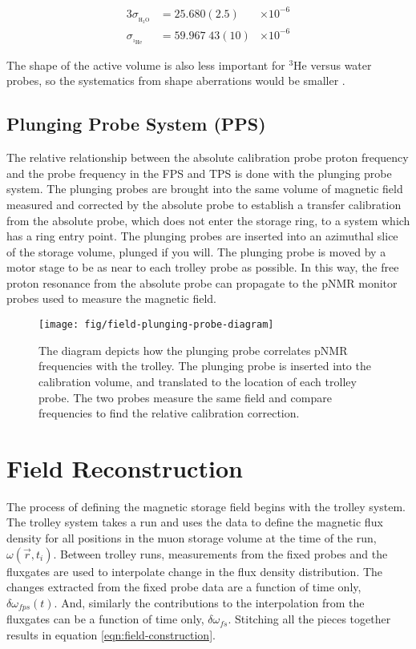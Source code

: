 \begin{alignat}{3}
\sigma_{_{\mathrm{H_2 O}}} & = 25.680(2.5)  & \times 10^{-6} \\
\sigma_{_{\mathrm{^3He}}}  & = 59.967\;43(10) & \times 10^{-6} 
\end{alignat}

\noindent
The shape of the active volume is also less important for $\mathrm{^3He}$ versus water probes, so the systematics from shape aberrations would be smaller \cite{e989-tdr}.

\subsection{Plunging Probe System (PPS)}

The relative relationship between the absolute calibration probe proton frequency and the probe frequency in the FPS and TPS is done with the plunging probe system.  The plunging probes are brought into the same volume of magnetic field measured and corrected by the absolute probe to establish a transfer calibration from the absolute probe, which does not enter the storage ring, to a system which has a ring entry point.  The plunging probes are inserted into an azimuthal slice of the storage volume, plunged if you will.  The plunging probe is moved by a motor stage to be as near to each trolley probe as possible.  In this way, the free proton resonance from the absolute probe can propagate to the pNMR monitor probes used to measure the \gmtwo magnetic field.

\begin{figure}
\label{fig:field-plunging-probe-diagram}
\texttt{[image: fig/field-plunging-probe-diagram]}
\caption{The diagram depicts how the plunging probe correlates pNMR frequencies with the trolley.  The plunging probe is inserted into the calibration volume, and translated to the location of each trolley probe.  The two probes measure the same field and compare frequencies to find the relative calibration correction.}
\end{figure}

\section{Field Reconstruction}

The process of defining the \gmtwo magnetic storage field begins with the trolley system.  The trolley system takes a run and uses the data to define the magnetic flux density for all positions in the muon storage volume at the time of the run, $\omega(\vec{r}, t_i)$.  Between trolley runs, measurements from the fixed probes and the fluxgates are used to interpolate change in the flux density distribution.  The changes extracted from the fixed probe data are a function of time only, $\delta \omega_{fps}(t)$.  And, similarly the contributions to the interpolation from the fluxgates can be a function of time only, $\delta \omega_{fs}$.  Stitching all the pieces together results in equation \ref{eqn:field-construction}.

